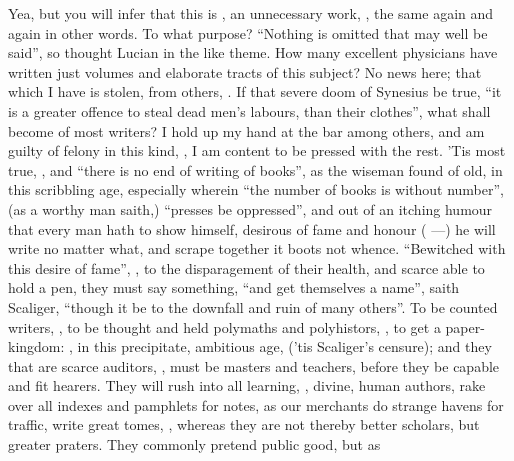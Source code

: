 Yea, but you will infer that this is , an
unnecessary work, , the same again and again
in other words. To what purpose? \enquote{Nothing is omitted that
may well be said}, so thought Lucian in the like theme. How many excellent
physicians have written just volumes and elaborate tracts of this subject? No
news here; that which I have is stolen, from others,
. If that severe doom of
Synesius be true, \enquote{it is a greater offence to steal dead
men's labours, than their clothes}, what shall become of most writers? I hold
up my hand at the bar among others, and am guilty of felony in this kind,
, I am content to be pressed with the rest. 'Tis
most true, , and
\enquote{there is no end of writing of books}, as the wiseman found
of old, in this scribbling age, especially wherein
\enquote{the number of books is without number}, (as a worthy man
saith,) \enquote{presses be oppressed}, and out of an itching humour that every man
hath to show himself, desirous of fame and honour
( ---) he will write no matter what, and scrape
together it boots not whence. \enquote{Bewitched with this desire of
fame}, , to the disparagement of their health, and
scarce able to hold a pen, they must say something, \enquote{and get
themselves a name}, saith Scaliger, \enquote{though it be to the downfall and ruin of
many others}. To be counted writers, , to be
thought and held polymaths and polyhistors, , to get a paper-kingdom: , in this precipitate, ambitious age,  ('tis
Scaliger's censure); and they that are scarce auditors,
, must be masters and teachers, before they be capable and
fit hearers. They will rush into all learning, , divine,
human authors, rake over all indexes and pamphlets for notes, as our merchants
do strange havens for traffic, write great tomes, , whereas they are not thereby better scholars, but
greater praters. They commonly pretend public good, but as
